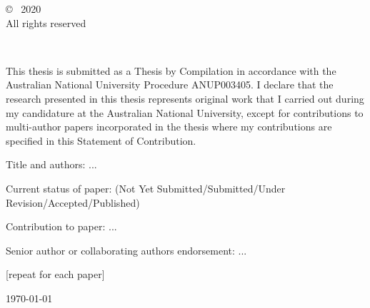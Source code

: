 \vspace*{14cm}
\begin{center}
  \makeatletter
  \copyright\ \@author{} 2020\\All rights reserved
  \makeatother
\end{center}
\noindent
\begin{center}
  \footnotesize{~} %
\end{center}
\noindent

\newpage






\vspace*{7cm}
    This thesis is submitted as a Thesis by Compilation in accordance with the
    Australian National University Procedure ANUP\textunderscore{}003405. I declare that the
    research presented in this thesis represents original work that I carried
    out during my candidature at the Australian National University, except
    for contributions to multi-author papers incorporated in the thesis where
    my contributions are specified in this Statement of Contribution.

    Title and authors: ...

    Current status of paper: (Not Yet Submitted/Submitted/Under Revision/Accepted/Published)

    Contribution to paper: ...

    Senior author or collaborating authors endorsement: ...

    [repeat for each paper]

\vspace*{4cm}

\hspace{8cm}\makeatletter\@author\makeatother\par
\hspace{8cm}\today
